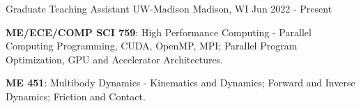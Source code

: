 

\begin{cventries}
	
	\cventry
	{Graduate Teaching Assistant} %
	{UW-Madison} %
	{Madison, WI} %
	{Jun 2022 - Present} %
	{
		\begin{cvitems} %
			\item {\textbf{ME/ECE/COMP SCI 759}: High Performance Computing - Parallel Computing Programming, CUDA, OpenMP, MPI; Parallel Program Optimization, GPU and Accelerator Architectures.}
			\item {\textbf{ME 451}: Multibody Dynamics - Kinematics and Dynamics; Forward and Inverse Dynamics; Friction and Contact.}
		\end{cvitems}
	}
	
	
	

\end{cventries}
